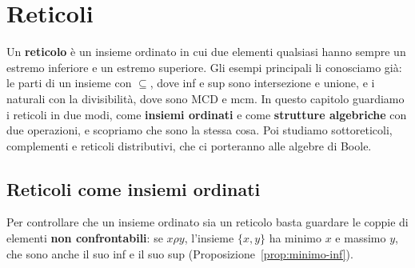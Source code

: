 \chapter{Reticoli}\label{cap:reticoli}

Un \textbf{reticolo} è un insieme ordinato in cui due elementi qualsiasi hanno sempre un estremo inferiore e un estremo superiore.
Gli esempi principali li conosciamo già: le parti di un insieme con $\subseteq$, dove inf e sup sono intersezione e unione, e i naturali
con la divisibilità, dove sono MCD e mcm. In questo capitolo guardiamo i reticoli in due modi, come \textbf{insiemi ordinati} e come
\textbf{strutture algebriche} con due operazioni, e scopriamo che sono la stessa cosa. Poi studiamo sottoreticoli, complementi e
reticoli distributivi, che ci porteranno alle algebre di Boole.

\section{Reticoli come insiemi ordinati}\label{sec:reticoli-ordinati}


Per controllare che un insieme ordinato sia un reticolo basta guardare le coppie di elementi \textbf{non confrontabili}: se $x \rho y$,
l'insieme $\{x, y\}$ ha minimo $x$ e massimo $y$, che sono anche il suo inf e il suo sup (Proposizione~\ref{prop:minimo-inf}).

